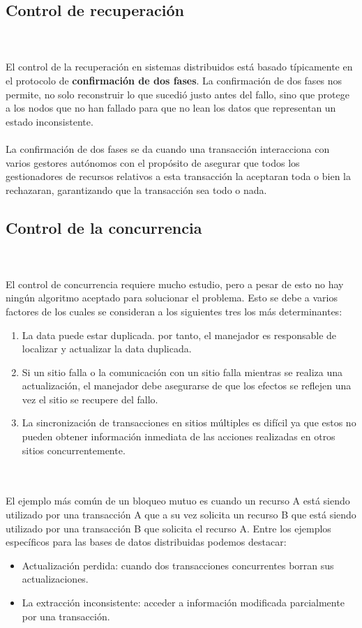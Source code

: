 \documentclass[10pt,a4paper,oneside]{article}
\begin{document}
\begin {itemize}
\subsection{Control de recuperaci\'on}
\\\\El control de la recuperaci\'on en sistemas distribuidos est\'a basado t\'ipicamente en el protocolo  de  {\bf confirmaci\'on de dos fases}. La confirmaci\'on de dos fases nos permite, no solo reconstruir lo que sucedi\'o justo antes del   fallo, sino que protege a los nodos que no han fallado para que no lean los datos que representan un estado inconsistente\cite{Pastor}.
\\\\La confirmaci\'on de dos fases se da cuando una transacci\'on interacciona con varios gestores aut\'onomos con el prop\'osito de asegurar que todos los gestionadores de recursos relativos a esta transacci\'on la aceptaran toda o bien la rechazaran, garantizando que la transacci\'on sea todo o nada\cite{Pastor}.

\subsection{Control de la concurrencia}
\\\\El control de concurrencia requiere mucho estudio, pero a pesar de esto no hay ning\'un algoritmo aceptado para solucionar el problema\cite{Carzola}. Esto se debe a varios factores de los cuales se consideran a los siguientes tres los m\'as determinantes:
\begin {enumerate}
\item La data puede estar duplicada. por tanto, el manejador  es responsable de localizar y actualizar la data duplicada.
\item Si un sitio falla o la comunicaci\'on con un sitio falla mientras se realiza una actualizaci\'on, el manejador debe asegurarse de que los efectos se reflejen una vez el sitio se recupere del fallo.
\item La sincronizaci\'on de transacciones en sitios m\'ultiples es dif\'icil ya que estos no pueden obtener informaci\'on inmediata de las acciones realizadas en otros sitios concurrentemente.
\end {enumerate}

\\\\El ejemplo m\'as com\'un de un bloqueo mutuo es cuando un recurso A est\'a siendo utilizado por una transacci\'on A que a su vez solicita un recurso B que est\'a siendo utilizado por una transacci\'on B que solicita el recurso A. Entre los ejemplos espec\'ificos para las bases de datos distribuidas podemos destacar:
\begin {itemize}
\item Actualizaci\'on perdida: cuando dos transacciones concurrentes borran sus actualizaciones.
\item La extracci\'on inconsistente: acceder a informaci\'on modificada parcialmente por una transacci\'on.
\end {itemize}


\end{itemize}
\end{document}
